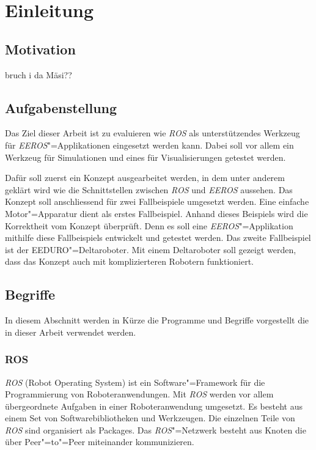 \chapter{Einleitung}
\section{Motivation}
bruch i da Mäsi??




\section{Aufgabenstellung}
Das Ziel dieser Arbeit ist zu evaluieren wie \textit{ROS} als unterstützendes Werkzeug für \textit{EEROS}"=Applikationen eingesetzt werden kann.
Dabei soll vor allem ein Werkzeug für Simulationen und eines für Visualisierungen getestet werden.

Dafür soll zuerst ein Konzept ausgearbeitet werden, in dem unter anderem geklärt wird wie die Schnittstellen zwischen \textit{ROS} und \textit{EEROS} aussehen.
Das Konzept soll anschliessend für zwei Fallbeispiele umgesetzt werden.
Eine einfache Motor"=Apparatur dient als erstes Fallbeispiel.
Anhand dieses Beispiels wird die Korrektheit vom Konzept überprüft.
Denn es soll eine \textit{EEROS}"=Applikation mithilfe diese Fallbeispiels entwickelt und getestet werden.
Das zweite Fallbeispiel ist der EEDURO"=Deltaroboter.
Mit einem Deltaroboter soll gezeigt werden, dass das Konzept auch mit komplizierteren Robotern funktioniert.

\section{Begriffe}
In diesem Abschnitt werden in Kürze die Programme und Begriffe vorgestellt  die in dieser Arbeit verwendet werden.

\subsection{ROS}
\textit{ROS} (Robot Operating System) ist ein Software"=Framework für die Programmierung von Roboteranwendungen.
Mit \textit{ROS} werden vor allem übergeordnete Aufgaben in einer Roboteranwendung umgesetzt.
Es besteht aus einem Set von Softwarebibliotheken und Werkzeugen.
Die einzelnen Teile von \textit{ROS} sind organisiert als Packages.
Das \textit{ROS}"=Netzwerk besteht aus Knoten die über Peer"=to"=Peer miteinander kommunizieren.

